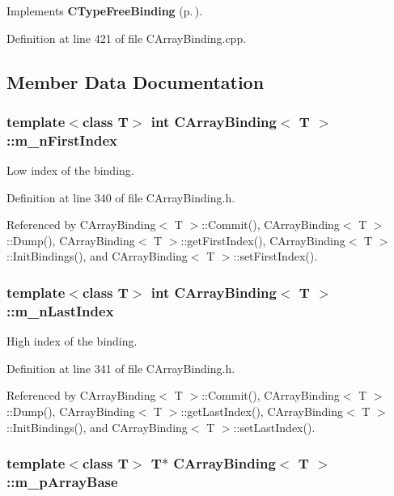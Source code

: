Implements {\bf CType\-Free\-Binding} {\rm (p.\,\pageref{classCTypeFreeBinding_a2})}.

Definition at line 421 of file CArray\-Binding.cpp.

\subsection{Member Data Documentation}
\subsubsection{\setlength{\rightskip}{0pt plus 5cm}template$<$class T$>$ int CArray\-Binding$<$ T $>$::m\_\-n\-First\-Index\hspace{0.3cm}{\tt  [private]}}\label{classCArrayBinding_o1}


Low index of the binding.



Definition at line 340 of file CArray\-Binding.h.

Referenced by CArray\-Binding$<$ T $>$::Commit(), CArray\-Binding$<$ T $>$::Dump(), CArray\-Binding$<$ T $>$::get\-First\-Index(), CArray\-Binding$<$ T $>$::Init\-Bindings(), and CArray\-Binding$<$ T $>$::set\-First\-Index().
\subsubsection{\setlength{\rightskip}{0pt plus 5cm}template$<$class T$>$ int CArray\-Binding$<$ T $>$::m\_\-n\-Last\-Index\hspace{0.3cm}{\tt  [private]}}\label{classCArrayBinding_o2}


High index of the binding.



Definition at line 341 of file CArray\-Binding.h.

Referenced by CArray\-Binding$<$ T $>$::Commit(), CArray\-Binding$<$ T $>$::Dump(), CArray\-Binding$<$ T $>$::get\-Last\-Index(), CArray\-Binding$<$ T $>$::Init\-Bindings(), and CArray\-Binding$<$ T $>$::set\-Last\-Index().
\subsubsection{\setlength{\rightskip}{0pt plus 5cm}template$<$class T$>$ T$\ast$ CArray\-Binding$<$ T $>$::m\_\-p\-Array\-Base\hspace{0.3cm}{\tt  [private]}}\label{classCArrayBinding_o0}


